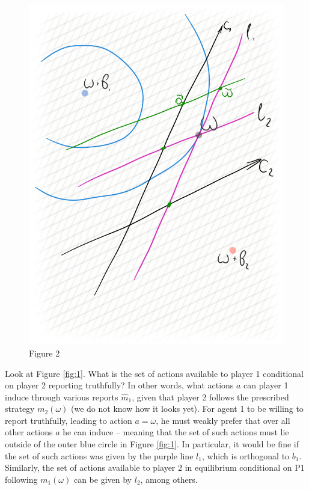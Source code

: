 \documentclass{article}
\begin{document}
\begin{figure}[b!]
{		\includegraphics[scale=0.25]{pics/battaglini04.png}
		\caption{Figure 2}
		\label{fig:2}
	}
\end{figure}

Look at Figure \ref{fig:1}. What is the set of actions available to player 1 conditional on player 2 reporting truthfully? In other words, what actions $a$ can player 1 induce through various reports $\hat{m}_1$, given that player 2 follows the prescribed strategy $m_2(\omega)$ (we do not know how it looks yet). For agent 1 to be willing to report truthfully, leading to action $a=\omega$, he must weakly prefer that over all other actions $a$ he can induce -- meaning that the set of such actions must lie outside of the outer blue circle in Figure \ref{fig:1}. In particular, it would be fine if the set of such actions was given by the purple line $l_1$, which is orthogonal to $b_1$. Similarly, the set of actions available to player 2 in equilibrium conditional on P1 following $m_1(\omega)$ can be given by $l_2$, among others.
\end{document}
